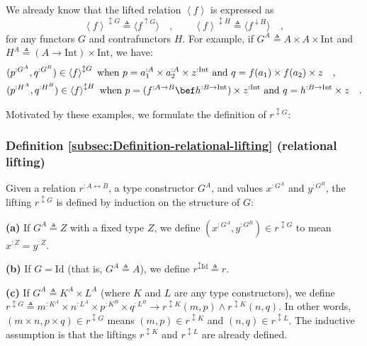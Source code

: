 We already know that the lifted relation $\left<f\right>$ is expressed
as 
\[
\left<f\right>^{\updownarrow G}\triangleq\langle f^{\uparrow G}\rangle\quad,\quad\quad\left<f\right>^{\updownarrow H}\triangleq\langle f^{\downarrow H}\rangle\quad,
\]
for any functors $G$ and contrafunctors $H$. For example, if $G^{A}\triangleq A\times A\times\text{Int}$
and $H^{A}\triangleq(A\rightarrow\text{Int})\times\text{Int}$, we
have:
\begin{align*}
 & (p^{:G^{A}},q^{:G^{B}})\in\left<f\right>^{\updownarrow G}\text{ when }p=a_{1}^{:A}\times a_{2}^{:A}\times z^{:\text{Int}}\text{ and }q=f(a_{1})\times f(a_{2})\times z\quad,\\
 & (p^{:H^{A}},q^{:H^{B}})\in\left<f\right>^{\updownarrow H}\text{ when }p=(f^{:A\rightarrow B}\bef h^{:B\rightarrow\text{Int}})\times z^{:\text{Int}}\text{ and }q=h^{:B\rightarrow\text{Int}}\times z\quad.
\end{align*}

Motivated by these examples, we formulate the definition of $r^{\updownarrow G}$:

\subsubsection{Definition \label{subsec:Definition-relational-lifting}\ref{subsec:Definition-relational-lifting}
(relational lifting)}

Given a relation $r^{:A\leftrightarrow B}$, a type constructor $G^{A}$,
and values $x^{:G^{A}}$ and $y^{:G^{B}}$, the lifting $r^{\updownarrow G}$
is defined by induction on the structure of $G$:

\textbf{(a)} If $G^{A}\triangleq Z$ with a fixed type $Z$, we define
$(x^{:G^{A}},y^{:G^{B}})\in r^{\updownarrow G}$ to mean $x^{:Z}=y^{:Z}$.

\textbf{(b)} If $G=\text{Id}$ (that is, $G^{A}\triangleq A$), we
define $r^{\updownarrow\text{Id}}\triangleq r$. 

\textbf{(c)} If $G^{A}\triangleq K^{A}\times L^{A}$ (where $K$ and
$L$ are any type constructors), we define $r^{\updownarrow G}\triangleq m^{:K^{A}}\times n^{:L^{A}}\times p^{:K^{B}}\times q^{:L^{B}}\rightarrow r^{\updownarrow K}(m,p)\wedge r^{\updownarrow K}(n,q)$.
In other words, $(m\times n,p\times q)\in r^{\updownarrow G}$ means
$(m,p)\in r^{\updownarrow K}$ and $(n,q)\in r^{\updownarrow L}$.
The inductive assumption is that the liftings $r^{\updownarrow K}$
and $r^{\updownarrow L}$ are already defined.

